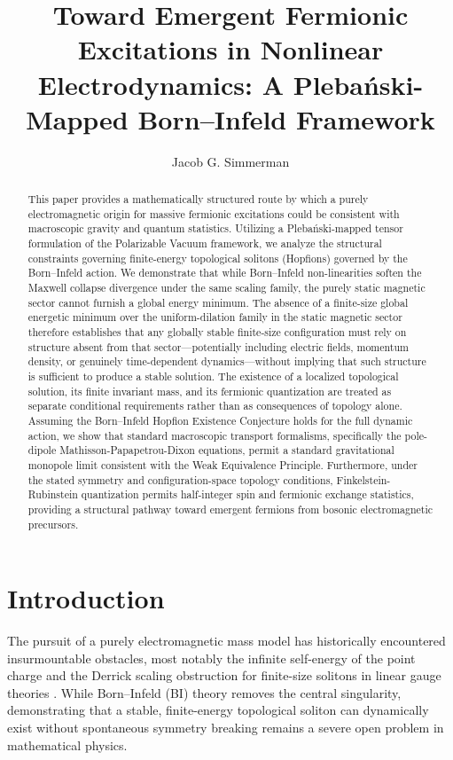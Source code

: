\documentclass[11pt,a4paper]{article}
\title{Toward Emergent Fermionic Excitations in Nonlinear Electrodynamics: A Pleba\'{n}ski-Mapped Born--Infeld Framework}
\author{Jacob G. Simmerman}
\date{}
\begin{document}
\maketitle

\begin{abstract}
This paper provides a mathematically structured route by which a purely electromagnetic origin for massive fermionic excitations could be consistent with macroscopic gravity and quantum statistics. Utilizing a Pleba\'{n}ski-mapped tensor formulation of the Polarizable Vacuum framework, we analyze the structural constraints governing finite-energy topological solitons (Hopfions) governed by the Born--Infeld action. We demonstrate that while Born--Infeld non-linearities soften the Maxwell collapse divergence under the same scaling family, the purely static magnetic sector cannot furnish a global energy minimum. The absence of a finite-size global energetic minimum over the uniform-dilation family in the static magnetic sector therefore establishes that any globally stable finite-size configuration must rely on structure absent from that sector---potentially including electric fields, momentum density, or genuinely time-dependent dynamics---without implying that such structure is sufficient to produce a stable solution. The existence of a localized topological solution, its finite invariant mass, and its fermionic quantization are treated as separate conditional requirements rather than as consequences of topology alone. Assuming the Born--Infeld Hopfion Existence Conjecture holds for the full dynamic action, we show that standard macroscopic transport formalisms, specifically the pole-dipole Mathisson-Papapetrou-Dixon equations, permit a standard gravitational monopole limit consistent with the Weak Equivalence Principle. Furthermore, under the stated symmetry and configuration-space topology conditions, Finkelstein-Rubinstein quantization permits half-integer spin and fermionic exchange statistics, providing a structural pathway toward emergent fermions from bosonic electromagnetic precursors.
\end{abstract}

\section{Introduction}
The pursuit of a purely electromagnetic mass model has historically encountered insurmountable obstacles, most notably the infinite self-energy of the point charge and the Derrick scaling obstruction for finite-size solitons in linear gauge theories \cite{Derrick1964}. While Born--Infeld (BI) theory \cite{Born1934} removes the central singularity, demonstrating that a stable, finite-energy topological soliton can dynamically exist without spontaneous symmetry breaking remains a severe open problem in mathematical physics.
\end{document}
